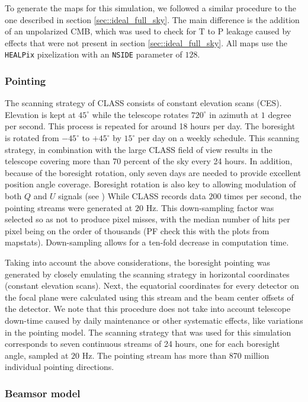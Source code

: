 \documentclass[a4paper,11pt]{article}
\begin{document}
To generate the maps for this simulation, we followed a similar procedure to the one described in section \ref{sec::ideal_full_sky}. The main difference is the addition of an unpolarized CMB, which was used to check for T to P leakage caused by effects that were not present in section \ref{sec::ideal_full_sky}. All maps use the \texttt{HEALPix} pixelization with an \texttt{NSIDE} parameter of $128$. 

\subsubsection{Pointing}

The scanning strategy of CLASS consists of constant elevation scans (CES). Elevation is kept at $45^{\circ}$ while the telescope rotates $720^\circ$ in azimuth at $1$ degree per second. This process is repeated for around 18 hours per day. The boresight is rotated from $-45^{\circ}$ to $+45^{\circ}$ by $15^{\circ}$ per day on a weekly schedule. This scanning strategy, in combination with the large CLASS field of view results in the telescope covering more than 70 percent of the sky every 24 hours. In addition, because of the boresight rotation, only seven days are needed to provide excellent position angle coverage. Boresight rotation is also key to allowing modulation of both $Q$ and $U$ signals (see \cite{2016SPIE.9914E..1KH}) While CLASS records data $200$ times per second, the pointing streams were generated at $20$ Hz. This down-sampling factor was selected so as not to produce pixel misses, with the median number of hits per pixel being on the order of thousands (PF check this with the plots from mapstats). Down-sampling allows for a ten-fold decrease in computation time.

Taking into account the above considerations, the boresight pointing was generated by closely emulating the scanning strategy in horizontal coordinates (constant elevation scans). Next, the equatorial coordinates for every detector on the focal plane were calculated using this stream and the beam center offsets of the detector. We note that this procedure does not take into account telescope down-time caused by daily maintenance or other systematic effects, like variations in the pointing model. The scanning strategy that was used for this simulation corresponds to seven continuous streams of 24 hours, one for each boresight angle, sampled at $20$ Hz. The pointing stream has more than 870 million individual pointing directions. 

\subsubsection{Beamsor model}
\end{document}
